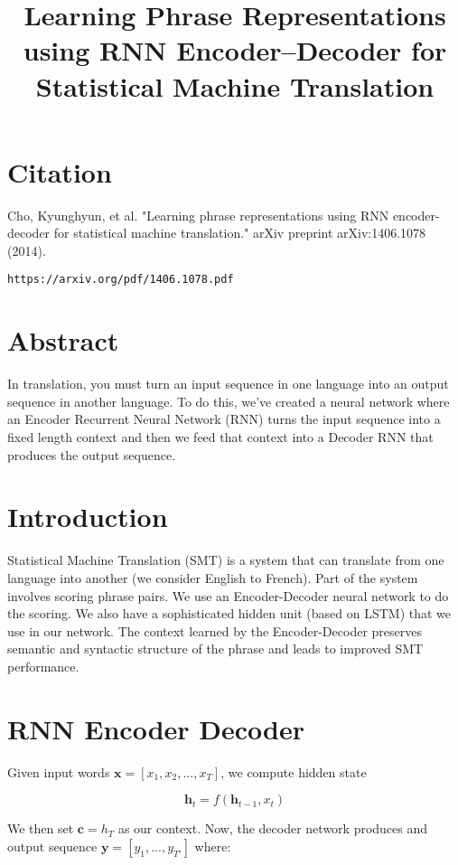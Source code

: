 \documentclass[a4paper]{article}
\title{Learning Phrase Representations using RNN Encoder–Decoder for
Statistical Machine Translation}
\date{}
\begin{document}
\maketitle

\section{Citation}
Cho, Kyunghyun, et al. "Learning phrase representations using RNN encoder-decoder for statistical machine translation." arXiv preprint arXiv:1406.1078 (2014).

\begin{verbatim}
https://arxiv.org/pdf/1406.1078.pdf
\end{verbatim}

\section{Abstract}
In translation, you must turn an input sequence in one language into an
output sequence in another language. To do this, we've created a neural network
where an Encoder Recurrent Neural Network (RNN) turns the input sequence into
a fixed length context and then we feed that context into a Decoder RNN that
produces the output sequence.

\section{Introduction}
Statistical Machine Translation (SMT) is a system that can translate from one
language into another (we consider English to French). Part of the system
involves scoring phrase pairs. We use an Encoder-Decoder neural network to do
the scoring. We also have a sophisticated hidden unit (based on LSTM) that we
use in our network. The context learned by the Encoder-Decoder preserves
semantic and syntactic structure of the phrase and leads to improved SMT
performance.

\section{RNN Encoder Decoder}
Given input words $\mathbf{x} = [x_1, x_2, ..., x_{T}]$, we compute hidden state

$$
\mathbf{h}_t = f(\mathbf{h}_{t-1}, x_t)
$$

We then set $\mathbf{c} = h_T$ as our context. Now, the decoder network produces
and output sequence $\mathbf{y} = [y_1, ..., y_{T'}]$ where:
\end{document}
